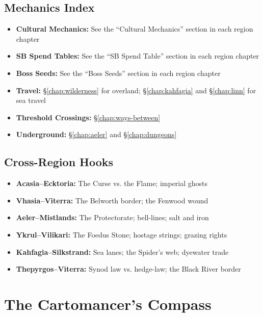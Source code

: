 \documentclass[12pt,oneside]{book}
\newcommand{\secref}[1]{§\ref{#1}}
\begin{document}
\section{Mechanics Index}

\begin{itemize}
  \item \textbf{Cultural Mechanics:} See the ``Cultural Mechanics'' section in each region chapter
  \item \textbf{SB Spend Tables:} See the ``SB Spend Table'' section in each region chapter
  \item \textbf{Boss Seeds:} See the ``Boss Seeds'' section in each region chapter
  \item \textbf{Travel:} \secref{chap:wilderness} for overland; \secref{chap:kahfagia} and \secref{chap:linn} for sea travel
  \item \textbf{Threshold Crossings:} \secref{chap:ways-between}
  \item \textbf{Underground:} \secref{chap:aeler} and \secref{chap:dungeons}
\end{itemize}

\section{Cross-Region Hooks}

\begin{itemize}
  \item \textbf{Acasia--Ecktoria:} The Curse vs. the Flame; imperial ghosts
  \item \textbf{Vhasia--Viterra:} The Belworth border; the Fenwood wound
  \item \textbf{Aeler--Mistlands:} The Protectorate; bell-lines; salt and iron
  \item \textbf{Ykrul--Vilikari:} The Foedus Stone; hostage strings; grazing rights
  \item \textbf{Kahfagia--Silkstrand:} Sea lanes; the Spider's web; dyewater trade
  \item \textbf{Thepyrgos--Viterra:} Synod law vs. hedge-law; the Black River border
\end{itemize}


\chapter*{The Cartomancer's Compass}
\label{chap:cartomancer-compass}
\end{document}
